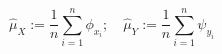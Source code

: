\documentclass[twoside]{article} \usepackage{aistats2017}
\theoremstyle{definition}
\theoremstyle{theorem}
\newcommand{\rv}[1]{{#1}}
\newcommand{\inner}[2]{{\langle #1, #2 \rangle}}
\newcommand{\hatmuX}{\hat{\mu}_{\rv{X}}}
\newcommand{\hatmuY}{\hat{\mu}_{\rv{Y}}}
\begin{document}
			\begin{equation}
				\hatmuX := \frac{1}{n} \sum_{i = 1}^{n} \phi_{x_{i}} ;\quad \hatmuY := \frac{1}{n} \sum_{i = 1}^{n} \psi_{y_{i}}
			\label{eq:empirical_embedding}
			\end{equation}

%
\end{document}
